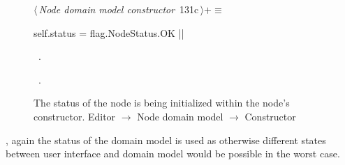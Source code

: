 \documentclass[%
    a4paper,    %
    justified,  %
    nobib,      %
    openany     %
]{tufte-book}
\makeatletter
\renewcommand{\label}[1]{\@tufte@label{##1}}%
\makeatother
\begin{document}
\begin{figure}[!htbp]
\begin{flushleft} \small
\begin{minipage}{\linewidth}\label{scrap75}\raggedright\small
{} $\langle\,${\itshape Node domain model constructor}\nobreak\ {\footnotesize {131c}}$\,\rangle+\equiv$
\vspace{-1ex}
\begin{pythoncode}
    self.status = flag.NodeStatus.OK
|\NWsep|
\end{pythoncode}
\vspace{1.5ex}
\footnotesize
\begin{list}{}{\setlength{\itemsep}{-\parsep}\setlength{\itemindent}{-\leftmargin}}
\item \NWtxtMacroDefBy\ .
\item \NWtxtMacroRefIn\ .

\item{}
\end{list}
\end{minipage}\vspace{4ex}
\end{flushleft}
\caption{The status of the node is being initialized within the node's constructor.
  \newline{}\newline{}Editor $\rightarrow$ Node domain model $\rightarrow$
  Constructor}
\end{figure}

, again the status of the domain model is
used as otherwise different states between user interface and domain model would
be possible in the worst case.
\end{document}
